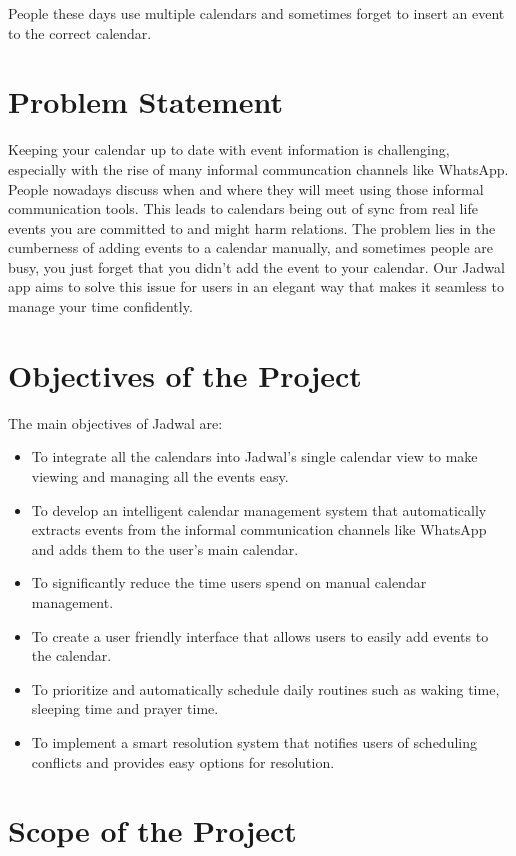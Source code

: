 \documentclass[12pt,a4paper]{report}
\begin{document}
People these days use multiple calendars and sometimes forget to insert an event to the correct calendar.
\section{Problem Statement}

Keeping your calendar up to date with event information is challenging, especially with the rise of many informal communcation channels like WhatsApp. People nowadays discuss when and where they will meet using those informal communication tools. This leads to calendars being out of sync from real life events you are committed to and might harm relations. The problem lies in the cumberness of adding events to a calendar manually, and sometimes people are busy, you just forget that you didn't add the event to your calendar. Our Jadwal app aims to solve this issue for users in an elegant way that makes it seamless to manage your time confidently.

\section{Objectives of the Project}

The main objectives of Jadwal are:
\begin{itemize}

    \item To integrate all the calendars into Jadwal's single calendar view to make viewing and managing all the events easy.
    \item To develop an intelligent calendar management system that automatically extracts events from the informal communication channels like WhatsApp and adds them to the user's main calendar.
    \item To significantly reduce the time users spend on manual calendar management.
    \item To create a user friendly interface that allows users to easily add events to the calendar.
    \item  To prioritize and automatically schedule daily routines such as waking time, sleeping time and prayer time.
    \item To implement a smart resolution system that notifies users of scheduling conflicts and provides easy options for resolution.
\end{itemize}

\section{Scope of the Project}
\end{document}
